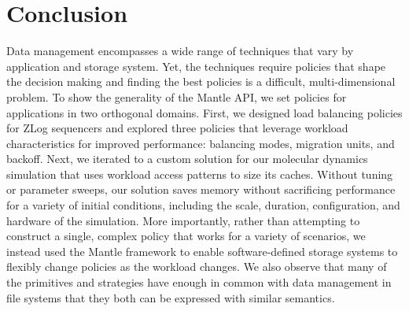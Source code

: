 \section{Conclusion}

Data management encompasses a wide range of techniques that vary by application
and storage system.  Yet, the techniques require policies that shape the
decision making and finding the best policies is a difficult, multi-dimensional
problem. To show the generality of the Mantle API, we set
policies for applications in two orthogonal domains. First, we designed load
balancing policies for ZLog sequencers and explored three policies that leverage
workload characteristics for improved performance: balancing modes, migration
units, and backoff. Next, we iterated to a custom solution for our molecular
dynamics simulation that uses workload access patterns to size its caches.
Without tuning or parameter sweeps, our solution saves memory without
sacrificing performance for a variety of initial conditions, including the
scale, duration, configuration, and hardware of the simulation. More
importantly, rather than attempting to construct a single, complex policy that
works for a variety of scenarios, we instead used the Mantle framework to enable
software-defined storage systems to flexibly change policies as the workload
changes.  We also observe that many of the primitives and strategies have
enough in common with data management in file systems that they both can be
expressed with similar semantics.

